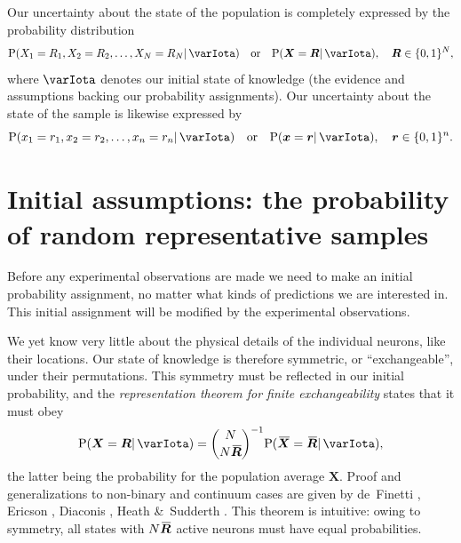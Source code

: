 \documentclass{article}
\theoremstyle{remark}
\theoremstyle{innote}
\newcommand*{\citep}{\parencites}
\renewcommand*{\cite}{\citep}
\newcommand*{\amp}{\&}
\renewcommand*{\|}{\mathpunct{|}}%
\DeclarePairedDelimiter\set{\{}{\}}
\newcommand*{\p}{\mathrm{P}}%
\theoremstyle{simple}
\newcommand*{\widebar}[1]{{\mkern1.5mu\skew{2}\overline{\mkern-1.5mu#1\mkern-1.5mu}\mkern 1.5mu}}
\newcommand*{\av}{\widebar} %
\newcommand*{\yxx}{x}%
\newcommand*{\yx}{\bm{\yxx}}%
\newcommand*{\yX}{\bm{X}}%
\newcommand*{\yXf}{\av{\yX}}%
\newcommand*{\yr}{\bm{r}}%
\newcommand*{\yR}{\bm{R}}%
\newcommand*{\yRf}{\av{\yR}}%
\newcommand*{\yH}{\varIota}
\begin{document}
Our uncertainty about the state of the population is completely expressed by the
probability distribution
\begin{equation}
  \label{eq:joint_plaus}
  \p(X_1=R_1, X_2=R_2, \dotsc, X_N=R_N \| \yH) \quad\text{or}\quad
\p(\yX =\yR \| \yH), \quad \yR \in \set{0,1}^N,
\end{equation}
where $\yH$ denotes our initial state of knowledge (the evidence and assumptions
backing our probability assignments). Our uncertainty about the state of
the sample is likewise expressed by
\begin{equation}
  \label{eq:sample_plaus}
  \p(x_1=r_1, x_2=r_2, \dotsc, x_n=r_n \| \yH) \quad\text{or}\quad
\p(\yx =\yr \| \yH), \quad \yr \in \set{0,1}^n.
\end{equation}

\section{Initial assumptions: the probability of random representative samples}
\label{sec:prob_samples}

Before any experimental observations are made we need to make an initial
probability assignment, no matter what kinds of predictions we are
interested in. This initial assignment will be modified by the experimental
observations.

We yet know very little about the physical details of the individual
neurons, like their locations. Our state of knowledge is therefore
symmetric, or \enquote{exchangeable}, under their permutations. This
symmetry must be reflected in our initial probability, and the
\emph{representation theorem for finite exchangeability} states that it
must obey
\begin{equation}
  \label{eq:joint_plaus_N_homog}
  \p(\yX = \yR \| \yH) = \binom{N}{N\yRf}^{-1} \p(\yXf=\yRf \| \yH),
\end{equation}
the latter being the probability for the population average $\yX$. Proof
and generalizations to non-binary and continuum cases are given by
de~Finetti \cite{definetti1959b}, Ericson \cite{ericson1976}, Diaconis
\cite{diaconis1977}, Heath \amp\ Sudderth \cite{heathetal1976}. This
theorem is intuitive: owing to symmetry, all states with $N\yRf$ active
neurons must have equal probabilities.
\end{document}
